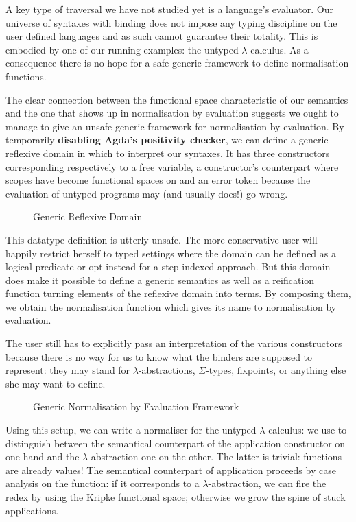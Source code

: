 A key type of traversal we have not studied yet is a language's
evaluator. Our universe of syntaxes with binding does not impose
any typing discipline on the user defined languages and as such
cannot guarantee their totality. This is embodied by one of our running
examples: the untyped $\lambda$-calculus. As a consequence there
is no hope for a safe generic framework to define normalisation
functions.

The clear connection between the  functional space
characteristic of our semantics and the one that shows up in
normalisation by evaluation suggests we ought to manage to
give an unsafe generic framework for normalisation by evaluation.
By temporarily \textbf{disabling Agda's positivity checker},
we can define a generic reflexive domain  in which to
interpret our syntaxes. It has three constructors corresponding
respectively to a free variable, a constructor's counterpart where
scopes have become  functional spaces on  and
an error token because the evaluation of untyped programs may
(and usually does!) go wrong.

\begin{figure}[h]
{\center {}}
\caption{Generic Reflexive Domain}
\end{figure}

This datatype definition is utterly unsafe. The more conservative
user will happily restrict herself to typed settings where the
domain can be defined as a logical predicate or opt instead for
a step-indexed approach. But this domain does make it possible
to define a generic  semantics as well as a reification
function turning elements of the reflexive domain into terms.
By composing them, we obtain the normalisation function which
gives its name to normalisation by evaluation.

The user still has to explicitly pass an interpretation of
the various constructors because there is no way for us to
know what the binders are supposed to represent: they may
stand for $\lambda$-abstractions, $\Sigma$-types, fixpoints, or
anything else she may want to define.


\begin{figure}[h]
\caption{Generic Normalisation by Evaluation Framework}
\end{figure}

Using this setup, we can write a normaliser for the untyped
$\lambda$-calculus: we use  to distinguish between
the semantical counterpart of the application constructor on
one hand and the $\lambda$-abstraction one on the other.
The latter is trivial: functions are already
values! The semantical counterpart of application proceeds by
case analysis on the function: if it corresponds to a
$\lambda$-abstraction, we can fire the redex by using the Kripke
functional space; otherwise we grow the spine of stuck
applications.

